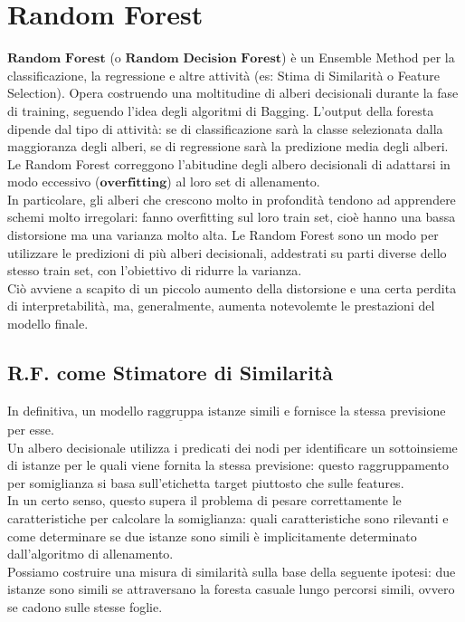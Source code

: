\section{Random Forest}
    $\textbf{Random Forest}$ (o $\textbf{Random Decision Forest}$) è un Ensemble Method per la classificazione, la regressione e altre attività (es: Stima di Similarità o Feature Selection).
    Opera costruendo una moltitudine di alberi decisionali durante la fase di training, seguendo l'idea degli algoritmi di Bagging.
    L'output della foresta dipende dal tipo di attività: se di classificazione sarà la classe selezionata dalla maggioranza degli alberi, se di regressione sarà la predizione media degli alberi.
    \\[1\baselineskip]
    Le Random Forest correggono l'abitudine degli albero decisionali di adattarsi in modo eccessivo ($\textbf{overfitting}$) al loro set di allenamento.
    \\[1\baselineskip]
    In particolare, gli alberi che crescono molto in profondità tendono ad apprendere schemi molto irregolari: fanno overfitting sul loro train set, cioè hanno una bassa distorsione ma una varianza molto alta.
    Le Random Forest sono un modo per utilizzare le predizioni di più alberi decisionali, addestrati su parti diverse dello stesso train set, con l'obiettivo di ridurre la varianza.
    \\
    Ciò avviene a scapito di un piccolo aumento della distorsione e una certa perdita di interpretabilità, ma, generalmente, aumenta notevolemte le prestazioni del modello finale.

    \subsection{R.F. come Stimatore di Similarità}
        In definitiva, $\underline{\textrm{un modello raggruppa istanze simili}}$ e fornisce la stessa previsione per esse.
        \\[1\baselineskip]
        Un albero decisionale utilizza i predicati dei nodi per identificare un sottoinsieme di istanze per le quali viene fornita la stessa previsione: questo raggruppamento per somiglianza si basa sull'etichetta target piuttosto che sulle features.
        \\
        In un certo senso, questo supera il problema di pesare correttamente le caratteristiche per calcolare la somiglianza: quali caratteristiche sono rilevanti e come determinare se due istanze sono simili è implicitamente determinato dall'algoritmo di allenamento.
        \\[1\baselineskip]
        Possiamo costruire una misura di similarità sulla base della seguente ipotesi: due istanze sono simili se attraversano la foresta casuale lungo percorsi simili, ovvero se cadono sulle stesse foglie.
        

